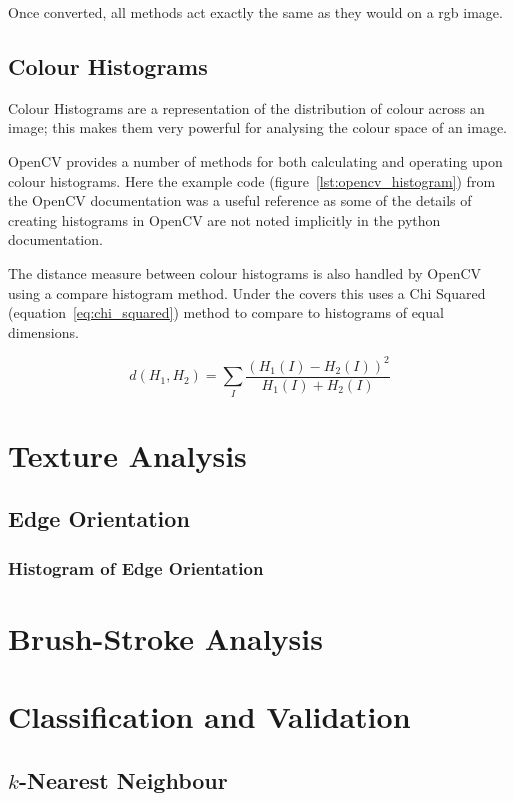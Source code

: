 Once converted, all methods act exactly the same as they would on a \gls{rgb} image.

\subsection{Colour Histograms}
Colour Histograms are a representation of the distribution of colour across an image; this makes
them very powerful for analysing the colour space of an image.

OpenCV provides a number of methods for both calculating and operating upon colour histograms. 
Here the example code (figure~\ref{lst:opencv_histogram}) from the OpenCV documentation was a
useful reference as some of the details of creating histograms in OpenCV are not noted implicitly
in the python documentation.

The distance measure between colour histograms is also handled by OpenCV using a compare histogram
method. Under the covers this uses a Chi Squared (equation~\ref{eq:chi_squared}) method to
compare to histograms of equal dimensions.

\begin{equation}\label{eq:chi_squared}
d(H_1,H_2) =\sum_I{\frac{(H_1(I) - H_2(I))^2}{H_1(I) + H_2(I)}}
\end{equation}


\section{Texture Analysis}

\subsection{Edge Orientation}
\subsubsection{Histogram of Edge Orientation}


\section{Brush-Stroke Analysis}


\section{Classification and Validation}

\subsection{$k$-Nearest Neighbour}

